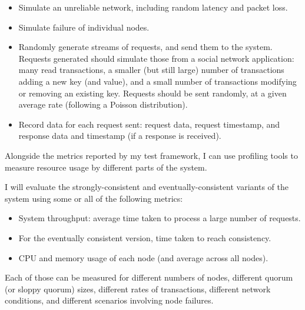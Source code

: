\begin{itemize}
  \item
  Simulate an unreliable network, including random latency and packet loss.

  \item
  Simulate failure of individual nodes.

  \item
  Randomly generate streams of requests, and send them to the system. Requests generated should simulate those from a social network application: many read transactions, a smaller (but still large) number of transactions adding a new key (and value), and a small number of transactions modifying or removing an existing key. Requests should be sent randomly, at a given average rate (following a Poisson distribution).


  \item
  Record data for each request sent: request data, request timestamp, and response data and timestamp (if a response is received).

\end{itemize}

Alongside the metrics reported by my test framework, I can use profiling tools to measure resource usage by different parts of the system.

I will evaluate the strongly-consistent and eventually-consistent variants of the system using some or all of the following metrics:

\begin{itemize}
  \item
  System throughput: average time taken to process a large number of requests.

  \item
  For the eventually consistent version, time taken to reach consistency.

  \item
  CPU and memory usage of each node (and average across all nodes).

\end{itemize}

Each of those can be measured for different numbers of nodes, different quorum (or sloppy quorum) sizes, different rates of transactions, different network conditions, and different scenarios involving node failures.

